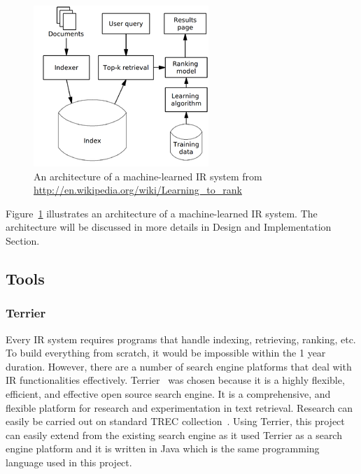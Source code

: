 \begin{figure}
\centering
\includegraphics[scale=0.7]{./figures/letor.png}
\caption{An architecture of a machine-learned IR system from \protect\url{http://en.wikipedia.org/wiki/Learning_to_rank}} \label{fig:letor} 
\end{figure}
Figure~\ref{fig:letor} illustrates an architecture of a machine-learned IR system. The architecture will be discussed in more details in Design and 
Implementation Section.

\subsection{Tools}
\subsubsection{Terrier}\label{section:terrier}
Every IR system requires programs that handle indexing, retrieving, ranking, etc. To build everything from scratch, it would be impossible within
the 1 year duration. However, there are a number of search engine platforms that deal with IR functionalities effectively.
Terrier~\cite{terrier} was chosen because it is a highly flexible, efficient, and effective open source search engine.
It is a comprehensive, and flexible platform for research and experimentation in text retrieval. Research can easily be 
carried out on standard TREC collection~\cite{trec}. 
Using Terrier, this project can easily extend from the existing search engine as it used Terrier as a search engine platform and it is written in Java
which is the same programming language used in this project.

